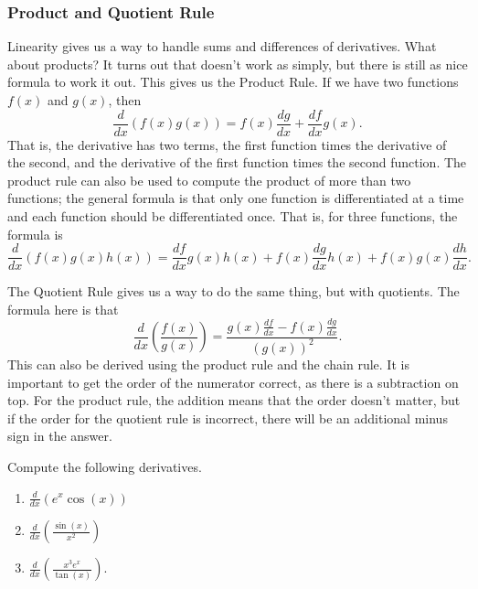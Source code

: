\subsubsection{Product and Quotient Rule}

Linearity gives us a way to handle sums and differences of derivatives. What about products? It turns out that doesn't work as simply, but there is still as nice formula to work it out. This gives us the Product Rule. If we have two functions $f(x)$ and $g(x)$, then 
\[ \frac{d}{dx}\left( f(x)g(x) \right) = f(x)\frac{dg}{dx} + \frac{df}{dx}g(x). \] That is, the derivative has two terms, the first function times the derivative of the second, and the derivative of the first function times the second function. The product rule can also be used to compute the product of more than two functions; the general formula is that only one function is differentiated at a time and each function should be differentiated once. That is, for three functions, the formula is
\[ \frac{d}{dx}\left( f(x)g(x)h(x)\right) = \frac{df}{dx}g(x)h(x) + f(x)\frac{dg}{dx}h(x) + f(x)g(x)\frac{dh}{dx}. \]

The Quotient Rule gives us a way to do the same thing, but with quotients. The formula here is that
\[ \frac{d}{dx}\left(\frac{f(x)}{g(x)}\right) = \frac{g(x) \frac{df}{dx} - f(x)\frac{dg}{dx}}{(g(x))^2}. \] This can also be derived using the product rule and the chain rule. It is important to get the order of the numerator correct, as there is a subtraction on top. For the product rule, the addition means that the order doesn't matter, but if the order for the quotient rule is incorrect, there will be an additional minus sign in the answer.

\begin{example}
Compute the following derivatives.
\begin{enumerate}
\item $\frac{d}{dx}\left(e^x \cos(x) \right)$
\item $\frac{d}{dx}\left(\frac{\sin(x)}{x^2}\right)$
\item $\frac{d}{dx}\left(\frac{x^3e^x}{\tan(x)}\right)$.
\end{enumerate}
\end{example}

